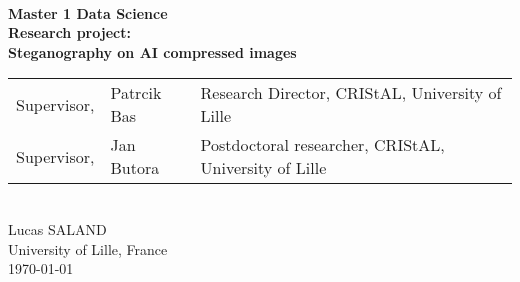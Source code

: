 \begin{titlepage}
    \begin{center}
        \\
        \Large
        \textbf{Master 1 Data Science}\\
        \vspace*{.5cm}
        \LARGE
        \textbf{Research project: \\Steganography on AI compressed images}\\
        \vspace{1cm}
        \small
        \vfill
        \begin{tabular}{lll}
            Supervisor, & Patrcik Bas & Research Director, CRIStAL, University of Lille\\
            Supervisor, & Jan Butora & Postdoctoral researcher, CRIStAL, University of Lille\\
        \end{tabular}
        \vspace{1cm}\\
        \large
        Lucas SALAND\\
        University of Lille, France\\
        \today\\
    \end{center}
\end{titlepage}